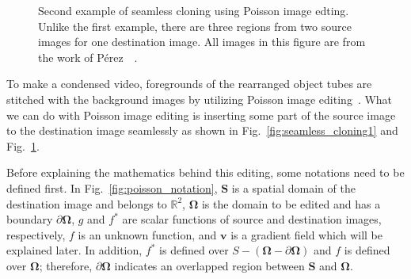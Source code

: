 \documentclass[11pt]{hyu_thesis}
\begin{document}
\begin{figure}
{{{			}
		}
	}
	\caption{Second example of seamless cloning using Poisson image edting. Unlike the first example, there are three regions from two source images for one destination image. All images in this figure are from the work of P{\'e}rez~\etal~\cite{Perez2003}.}
	\label{fig:seamless_cloning2}
\end{figure}
To make a condensed video, foregrounds of the rearranged object tubes are stitched with the background images by utilizing Poisson image editing~\cite{Perez2003}. What we can do with Poisson image editing is inserting some part of the source image to the destination image seamlessly as shown in Fig.~\ref{fig:seamless_cloning1} and Fig.~\ref{fig:seamless_cloning2}.

Before explaining the mathematics behind this editing, some notations need to be defined first. In Fig.~\ref{fig:poisson_notation}, $\boldsymbol{S}$ is a spatial domain of the destination image and belongs to $\mathbb{R}^2$, $\boldsymbol\Omega$ is the domain to be edited and has a boundary $\partial\boldsymbol\Omega$, $g$ and $f^{*}$ are scalar functions of source and destination images, respectively, $f$ is an unknown function, and $\textbf{v}$ is a gradient field which will be explained later. In addition, $f^{*}$ is defined over $S-(\boldsymbol\Omega-\partial\boldsymbol\Omega)$ and $f$ is defined over $\boldsymbol\Omega$; therefore, $\partial\boldsymbol\Omega$ indicates an overlapped region between $\boldsymbol{S}$ and $\boldsymbol\Omega$.
\end{document}
